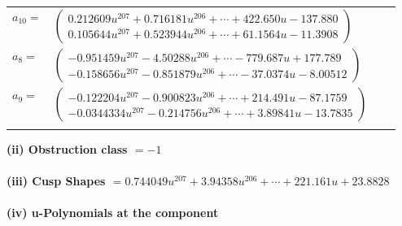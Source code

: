 \documentclass[1p]{elsarticle_modified}
\theoremstyle{definition}
\begin{document}
\begin{tabular}{m{7pt} m{180pt} m{7pt} m{180pt} }
\flushright $a_{10}=$&$\begin{pmatrix}0.212609 u^{207}+0.716181 u^{206}+\cdots+422.650 u-137.880\\0.105644 u^{207}+0.523944 u^{206}+\cdots+61.1564 u-11.3908\end{pmatrix}$ \\
\flushright $a_{8}=$&$\begin{pmatrix}-0.951459 u^{207}-4.50288 u^{206}+\cdots-779.687 u+177.789\\-0.158656 u^{207}-0.851879 u^{206}+\cdots-37.0374 u-8.00512\end{pmatrix}$ \\
\flushright $a_{9}=$&$\begin{pmatrix}-0.122204 u^{207}-0.900823 u^{206}+\cdots+214.491 u-87.1759\\-0.0344334 u^{207}-0.214756 u^{206}+\cdots+3.89841 u-13.7835\end{pmatrix}$\\&\end{tabular}
\flushleft \textbf{(ii) Obstruction class $= -1$}\\~\\
\flushleft \textbf{(iii) Cusp Shapes $= 0.744049 u^{207}+3.94358 u^{206}+\cdots+221.161 u+23.8828$}\\~\\
\newpage\renewcommand{\arraystretch}{1}
\flushleft \textbf{(iv) u-Polynomials at the component}\newline \\
\end{document}
